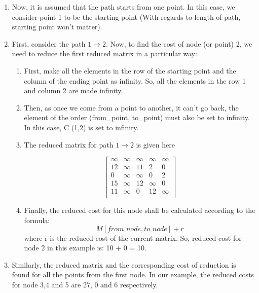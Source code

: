\documentclass{article}
\begin{document}
\begin{enumerate}
    \item Now, it is assumed that the path starts from one point. In
this case, we consider point 1 to be the starting point
(With regards to length of path, starting point won’t
matter).

    \item First, consider the path $1 \rightarrow 2$. Now, to find the cost of
node (or point) 2, we need to reduce the first reduced
matrix in a particular way:

    \begin{enumerate}

        \item First, make all the elements in the row of the
starting point and the column of the ending
point as infinity. So, all the elements in the row
1 and column 2 are made infinity.

        \item Then, as once we come from a point to another,
it can’t go back, the element of the order
(from\_point, to\_point) must also be set to
infinity. In this case, C (1,2) is set to infinity.

        \item The reduced matrix for path $1 \rightarrow 2$ is given here

        $$
        \left[ {\begin{array}{ccccc}
             \infty & \infty & \infty & \infty & \infty\\
             12 & \infty & 11 & 2 & 0\\
             0 & \infty & \infty & 0 & 2\\
             15 & \infty & 12 & \infty & 0\\
             11 & \infty & 0 & 12 & \infty\\
        \end{array} }
        \right]
        $$


        \item Finally, the reduced cost for this node shall be
calculated according to the formula:
        $$M[ from\_node, to\_node] + r$$
where r is the
reduced cost of the current matrix.
So, reduced cost for node 2 in this example is:
10 + 0 = 10.

    \end{enumerate}

    \item Similarly, the reduced matrix and the corresponding
cost of reduction is found for all the points from the
first node. In our example, the reduced costs for node
3,4 and 5 are 27, 0 and 6 respectively.


\end{enumerate}
\end{document}
